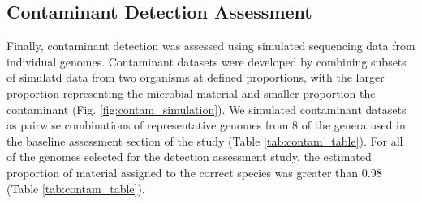 \documentclass[fleqn,10pt,lineno]{wlpeerj}\usepackage[]{graphicx}\usepackage[]{color}
\begin{document}
\subsection*{Contaminant Detection Assessment}
\begin{table}[ht]
\centering
{}
\caption{Representative strains used in simulated contaminant datasets. When available type strains were selected as the representative genome. Species indicates the proportion of the material assigned to the correct species. DNA size (Mb) and Genbank accession numbers (Acc) are indicated for chromosomes (C) and plasmids (P). Escherichia coli O157:H7 str. EC4115 and Yersinia pestis CO92 have two and three plasmids respectively.} 
\label{tab:contam_table}
\end{table}



Finally, contaminant detection was assessed using simulated sequencing data from individual genomes. Contaminant datasets were developed by combining subsets of simulatd data from two organisms at defined proportions,
with the larger proportion representing the microbial material and smaller proportion the contaminant (Fig. \ref{fig:contam_simulation}).
We simulated contaminant datasets as pairwise combinations of representative genomes from 8 of the genera used in the baseline assessment section of the study (Table \ref{tab:contam_table}).
For all of the genomes selected for the detection assessment study, the estimated proportion of material assigned to the correct species was greater than 0.98 (Table \ref{tab:contam_table}).
\end{document}
